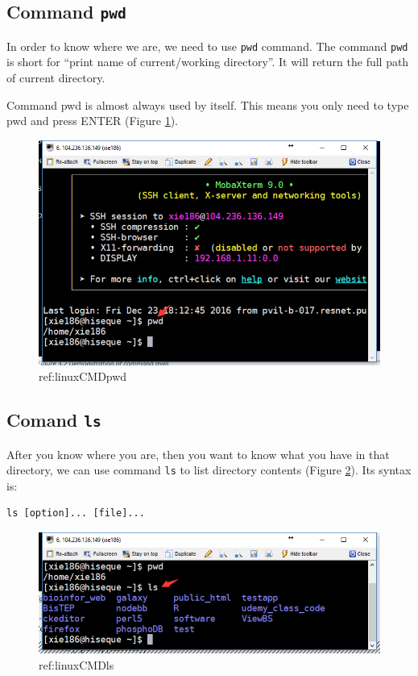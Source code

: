 \documentclass[]{book}
\theoremstyle{definition}
\theoremstyle{definition}
\theoremstyle{definition}
\theoremstyle{remark}
\begin{document}
\subsection{\texorpdfstring{Command
\texttt{pwd}}{Command pwd}}\label{command-pwd}

In order to know where we are, we need to use \texttt{pwd} command. The
command \texttt{pwd} is short for ``print name of current/working
directory''. It will return the full path of current directory.

Command pwd is almost always used by itself. This means you only need to
type pwd and press ENTER (Figure \ref{fig:linuxCMDpwd}).



\begin{figure}

{\centering \includegraphics[width=0.8\linewidth]{figures/linuxCMDpwd} 

}

\caption{ref:linuxCMDpwd}\label{fig:linuxCMDpwd}
\end{figure}

\subsection{\texorpdfstring{Comand
\texttt{ls}}{Comand ls}}\label{comand-ls}

After you know where you are, then you want to know what you have in
that directory, we can use command \texttt{ls} to list directory
contents (Figure \ref{fig:linuxCMDls}). Its syntax is:

\begin{verbatim}
ls [option]... [file]...
\end{verbatim}



\begin{figure}

{\centering \includegraphics[width=0.8\linewidth]{figures/linuxCMDls} 

}

\caption{ref:linuxCMDls}\label{fig:linuxCMDls}
\end{figure}
\end{document}
